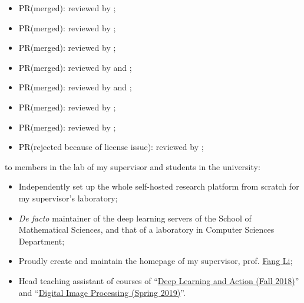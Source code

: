 \begin{itemize}
    \item PR(merged):  reviewed by \mbauman;
    \item PR(merged):  reviewed by \mikeinnes;
    \item PR(merged):  reviewed by \mikeinnes;
    \item PR(merged):  reviewed by \evizero and \timholy;
    \item PR(merged):  reviewed by \evizero and \timholy;
    \item PR(merged):  reviewed by \julio;
    \item PR(merged):  reviewed by \timholy;
    \item PR(rejected because of license issue):  reviewed by \timholy;
\end{itemize}
to members in the lab of my supervisor and students in the university:
\begin{itemize}
    \item Independently set up the whole self-hosted research platform from scratch for my supervisor's laboratory;
    \item \textit{De facto} maintainer of the deep learning servers of the School of Mathematical Sciences, and that of a laboratory in Computer Sciences Department;
    \item Proudly create and maintain the homepage of my supervisor, prof. \href{http://math.ecnu.edu.cn/~fli/}{\textsf{Fang Li}};
    \item Head teaching assistant of courses of ``\href{http://math.ecnu.edu.cn/~fli/Teaching/DeepLearning/Fall2018/index.html}{Deep Learning and Action (Fall 2018)}''  and ``\href{http://math.ecnu.edu.cn/~fli/Teaching/DigitalImageProcessing/Spring2019/index.html}{Digital Image Processing (Spring 2019)}''.
\end{itemize}

